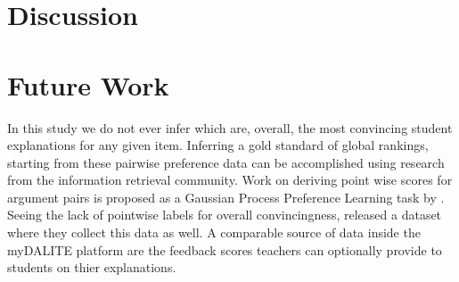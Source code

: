 \documentclass[runningheads]{llncs}
\begin{document}
\section{Discussion}

\section{Future Work}
In this study we do not ever infer which are, overall, the most convincing 
student explanations for any given item. Inferring a gold standard of global 
rankings, starting from these pairwise preference data can be accomplished 
using research from the information retrieval 
community\cite{chen_pairwise_2013}. Work on deriving point wise scores for 
argument pairs is proposed as a Gaussian Process Preference Learning task by 
\cite{simpson_finding_2018}. Seeing the lack of pointwise labels for overall 
convincingness, \cite{toledo_automatic_2019} released a dataset where they 
collect this data as well. A comparable source of data inside the myDALITE 
platform are the feedback scores teachers can optionally provide to students on 
thier explanations.


 
 
\end{document}
